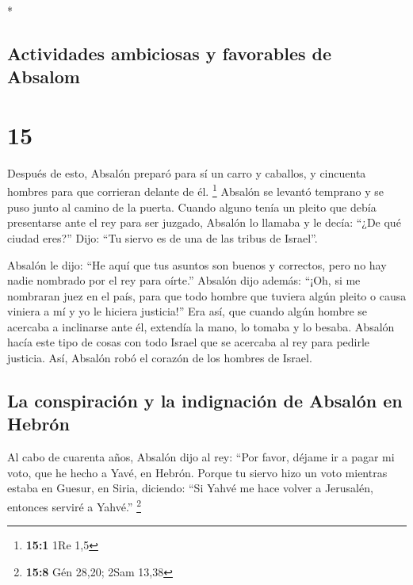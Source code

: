 \begin{paracol}{2}
\begin{otherlanguage}{english}
\end{otherlanguage}

\switchcolumn[0]*

\hypertarget{actividades-ambiciosas-y-favorables-de-absalom}{%
\subsection{Actividades ambiciosas y favorables de
Absalom}\label{actividades-ambiciosas-y-favorables-de-absalom}}

\hypertarget{section-28}{%
\section{15}\label{section-28}}

 Después de esto, Absalón preparó para sí un carro y
caballos, y cincuenta hombres para que corrieran delante de él.
\footnote{\textbf{15:1} 1Re 1,5}  Absalón se levantó
temprano y se puso junto al camino de la puerta. Cuando alguno tenía un
pleito que debía presentarse ante el rey para ser juzgado, Absalón lo
llamaba y le decía: ``¿De qué ciudad eres?'' Dijo: ``Tu siervo es de una
de las tribus de Israel''.

 Absalón le dijo: ``He aquí que tus asuntos son buenos y
correctos, pero no hay nadie nombrado por el rey para oírte.''
 Absalón dijo además: ``¡Oh, si me nombraran juez en el
país, para que todo hombre que tuviera algún pleito o causa viniera a mí
y yo le hiciera justicia!''  Era así, que cuando algún
hombre se acercaba a inclinarse ante él, extendía la mano, lo tomaba y
lo besaba.  Absalón hacía este tipo de cosas con todo
Israel que se acercaba al rey para pedirle justicia. Así, Absalón robó
el corazón de los hombres de Israel.

\hypertarget{la-conspiraciuxf3n-y-la-indignaciuxf3n-de-absaluxf3n-en-hebruxf3n}{%
\subsection{La conspiración y la indignación de Absalón en
Hebrón}\label{la-conspiraciuxf3n-y-la-indignaciuxf3n-de-absaluxf3n-en-hebruxf3n}}

 Al cabo de cuarenta años, Absalón dijo al rey: ``Por
favor, déjame ir a pagar mi voto, que he hecho a Yavé, en Hebrón.
 Porque tu siervo hizo un voto mientras estaba en Guesur,
en Siria, diciendo: ``Si Yahvé me hace volver a Jerusalén, entonces
serviré a Yahvé.'' \footnote{\textbf{15:8} Gén 28,20; 2Sam 13,38}


\end{paracol}
